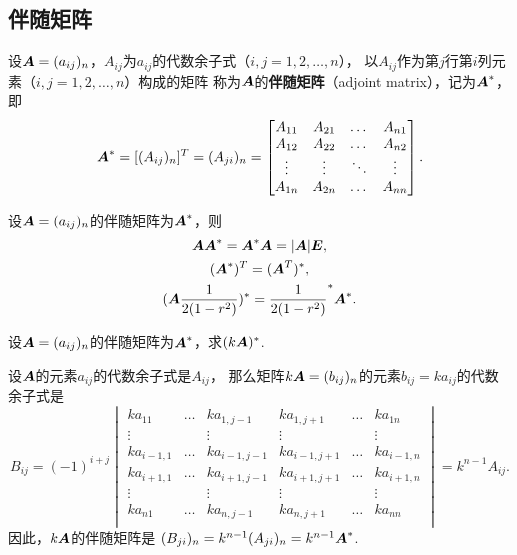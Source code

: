 \subsection{伴随矩阵}
\begin{definition}\label{definition:伴随矩阵.伴随矩阵的定义}
设\(\boldsymbol{A}=(a_{ij})_n\)，\(A_{ij}\)为\(a_{ij}\)的代数余子式（\(i,j=1,2,\dotsc,n\)），%
以\(A_{ij}\)作为第\(j\)行第\(i\)列元素（\(i,j=1,2,\dotsc,n\)）构成的矩阵%
称为\(\boldsymbol{A}\)的\textbf{伴随矩阵}（adjoint matrix），记为\(\boldsymbol{A}^*\)，即\[
\boldsymbol{A}^*
= [(A_{ij})_n]^T
= (A_{ji})_n
= \begin{bmatrix}
A_{11} & A_{21} & \dots & A_{n1} \\
A_{12} & A_{22} & \dots & A_{n2} \\
\vdots & \vdots & \ddots & \vdots \\
A_{1n} & A_{2n} & \dots & A_{nn}
\end{bmatrix}.
\]
\end{definition}

\begin{theorem}
设\(\boldsymbol{A}=(a_{ij})_n\)的伴随矩阵为\(\boldsymbol{A}^*\)，则\begin{gather}
\boldsymbol{A} \boldsymbol{A}^* = \boldsymbol{A}^* \boldsymbol{A} = \abs{\boldsymbol{A}} \boldsymbol{E}, \label{equation:行列式.伴随矩阵.恒等式1} \\
(\boldsymbol{A}^*)^T = (\boldsymbol{A}^T)^*, \label{equation:行列式.伴随矩阵.恒等式2} \\
(\boldsymbol{A}\frac{1}{2(1-r^2)})^* = \frac{1}{2(1-r^2)}^* \boldsymbol{A}^*. \label{equation:行列式.伴随矩阵.恒等式3}
\end{gather}
\end{theorem}

\begin{example}
设\(\boldsymbol{A}=(a_{ij})_n\)的伴随矩阵为\(\boldsymbol{A}^*\)，求\((k\boldsymbol{A})^*\).
\begin{solution}
设\(\boldsymbol{A}\)的元素\(a_{ij}\)的代数余子式是\(A_{ij}\)，%
那么矩阵\(k\boldsymbol{A} = (b_{ij})_n\)的元素\(b_{ij} = k a_{ij}\)的代数余子式是\[
	B_{ij}
	= (-1)^{i+j} \begin{vmatrix}
		k a_{11} & \dots & k a_{1,j-1} & k a_{1,j+1} & \dots & k a_{1n} \\
		\vdots & & \vdots & \vdots & & \vdots \\
		k a_{i-1,1} & \dots & k a_{i-1,j-1} & k a_{i-1,j+1} & \dots & k a_{i-1,n} \\
		k a_{i+1,1} & \dots & k a_{i+1,j-1} & k a_{i+1,j+1} & \dots & k a_{i+1,n} \\
		\vdots & & \vdots & \vdots & & \vdots \\
		k a_{n1} & \dots & k a_{n,j-1} & k a_{n,j+1} & \dots & k a_{nn} \\
	\end{vmatrix}
	= k^{n-1} A_{ij}.
\]
因此，\(k\boldsymbol{A}\)的伴随矩阵是
\((B_{ji})_n = k^{n-1} (A_{ji})_n
= k^{n-1} \boldsymbol{A}^*\).
\end{solution}
\end{example}

